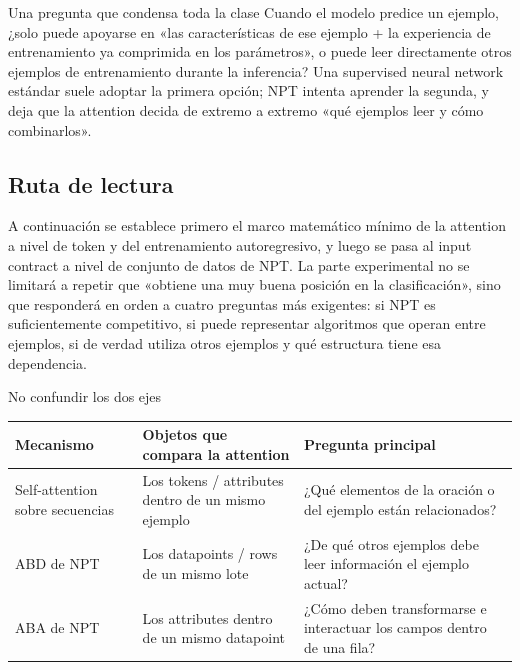 \begin{importantbox}{Una pregunta que condensa toda la clase}
Cuando el modelo predice un ejemplo, ¿solo puede apoyarse en «las características de ese ejemplo + la experiencia de entrenamiento ya comprimida en los parámetros», o puede leer directamente otros ejemplos de entrenamiento durante la inferencia? Una supervised neural network estándar suele adoptar la primera opción; NPT intenta aprender la segunda, y deja que la attention decida de extremo a extremo «qué ejemplos leer y cómo combinarlos».
\end{importantbox}


\subsection{Ruta de lectura}

A continuación se establece primero el marco matemático mínimo de la attention a nivel de token y del entrenamiento autoregresivo, y luego se pasa al input contract a nivel de conjunto de datos de NPT. La parte experimental no se limitará a repetir que «obtiene una muy buena posición en la clasificación», sino que responderá en orden a cuatro preguntas más exigentes: si NPT es suficientemente competitivo, si puede representar algoritmos que operan entre ejemplos, si de verdad utiliza otros ejemplos y qué estructura tiene esa dependencia.

\begin{knowledgebox}{No confundir los dos ejes}
\begin{tabularx}{\textwidth}{L{0.23\textwidth}>{\raggedright\arraybackslash}X >{\raggedright\arraybackslash}X}
\toprule
Mecanismo & Objetos que compara la attention & Pregunta principal \\
\midrule
Self-attention sobre secuencias & Los tokens / attributes dentro de un mismo ejemplo & ¿Qué elementos de la oración o del ejemplo están relacionados? \\
ABD de NPT & Los datapoints / rows de un mismo lote & ¿De qué otros ejemplos debe leer información el ejemplo actual? \\
ABA de NPT & Los attributes dentro de un mismo datapoint & ¿Cómo deben transformarse e interactuar los campos dentro de una fila? \\
\bottomrule
\end{tabularx}
\end{knowledgebox}

